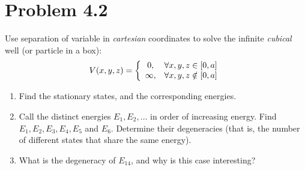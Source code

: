 \documentclass[../main.tex]{subfiles}
\begin{document}
\section{Problem 4.2}

Use separation of variable in \textit{cartesian} coordinates to solve the infinite \textit{cubical} well (or particle in a box):
\begin{gather*}
    V(x,y,z) = 
    \left\{
        \begin{array}{cc}
            0, & \forall x,y,z \in \qty[0,a] \\
            \infty, & \forall x,y,z \notin \qty[0,a] 
        \end{array}
    \right.
\end{gather*}

\begin{enumerate}
    \item Find the stationary states, and the corresponding energies.
    \item Call the distinct energies $E_1,E_2,\dots$ in order of increasing energy.
        Find $E_1,E_2,E_3,E_4,E_5$ and $E_6$.
        Determine their degeneracies (that is, the number of different states that share the same energy).
    \item What is the degeneracy of $E_{14}$, and why is this case interesting?
\end{enumerate}
\end{document}
